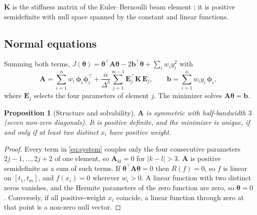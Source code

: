 \documentclass[11pt,a4paper]{article}
\newtheorem{proposition}[theorem]{Proposition}
\theoremstyle{definition}
\theoremstyle{remark}
\newcommand{\vth}{\boldsymbol{\theta}}
\newcommand{\vphi}{\boldsymbol{\phi}}
\newcommand{\vb}{\mathbf{b}}
\newcommand{\mA}{\mathbf{A}}
\newcommand{\mK}{\mathbf{K}}
\begin{document}
$\mK$ is the stiffness matrix of the Euler--Bernoulli beam element \citep{Hughes2000}; it is positive semidefinite with null space spanned by the constant and linear functions.

\subsection{Normal equations}

Summing both terms, $J(\vth)=\vth^\top\mA\vth-2\vb^\top\vth+\sum_iw_iy_i^2$ with
\begin{equation}
\label{eq:system}
\mA=\sum_{i=1}^{n}w_i\,\vphi_i\vphi_i^\top+\frac{\alpha}{\Delta^3}\sum_{j=1}^{m-1}\mathbf E_j^\top\mK\,\mathbf E_j,\qquad
\vb=\sum_{i=1}^{n}w_iy_i\,\vphi_i,
\end{equation}
where $\mathbf E_j$ selects the four parameters of element $j$. The minimizer solves $\mA\vth=\vb$.

\begin{proposition}[Structure and solvability]
\label{prop:spd}
$\mA$ is symmetric with half-bandwidth $3$ (seven non-zero diagonals). It is positive definite, and the minimizer is unique, if and only if at least two distinct $x_i$ have positive weight.
\end{proposition}

\begin{proof}
Every term in \eqref{eq:system} couples only the four consecutive parameters $2j-1,\dots,2j+2$ of one element, so $\mA_{kl}=0$ for $|k-l|>3$. $\mA$ is positive semidefinite as a sum of such terms. If $\vth^\top\mA\vth=0$ then $R(f)=0$, so $f$ is linear on $[t_1,t_m]$, and $f(x_i)=0$ wherever $w_i>0$. A linear function with two distinct zeros vanishes, and the Hermite parameters of the zero function are zero, so $\vth=0$. Conversely, if all positive-weight $x_i$ coincide, a linear function through zero at that point is a non-zero null vector.
\end{proof}
\end{document}
